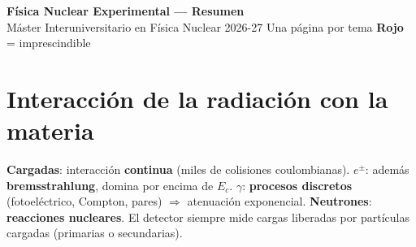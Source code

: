 \documentclass[10pt,a4paper]{article}
\newcommand{\imp}[1]{\textbf{\color{BrickRed}#1}}
\begin{document}
\begin{center}
{\LARGE\bfseries\color{NavyBlue} Física Nuclear Experimental --- Resumen}\\[2pt]
{\small Máster Interuniversitario en Física Nuclear 2026-27 \textperiodcentered{} Una página por tema \textperiodcentered{} \imp{Rojo} = imprescindible}
\end{center}

\section{Interacción de la radiación con la materia}
\begin{clave}
\textbf{Cargadas}: interacción \imp{continua} (miles de colisiones coulombianas). \textbf{$e^\pm$}: además \imp{bremsstrahlung}, domina por encima de $E_c$.
\textbf{$\gamma$}: \imp{procesos discretos} (fotoeléctrico, Compton, pares) $\Rightarrow$ atenuación exponencial. \textbf{Neutrones}: \imp{reacciones nucleares}.
El detector siempre mide cargas liberadas por partículas cargadas (primarias o secundarias).
\end{clave}
\end{document}
